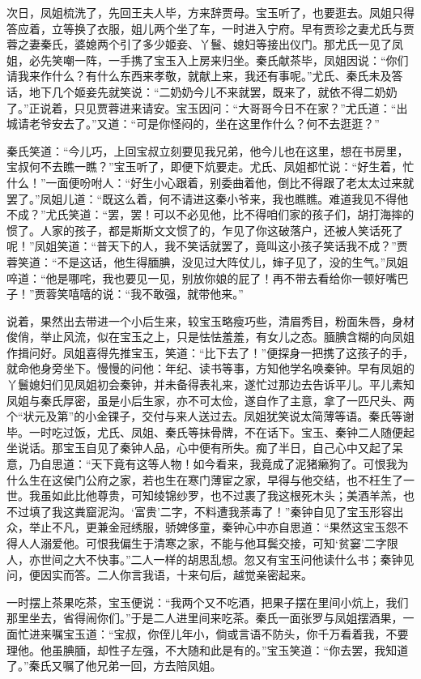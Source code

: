 \documentclass[12pt,oneside]{book}
\begin{document}
次日，凤姐梳洗了，先回王夫人毕，方来辞贾母。宝玉听了，也要逛去。凤姐只得答应着，立等换了衣服，姐儿两个坐了车，一时进入宁府。早有贾珍之妻尤氏与贾蓉之妻秦氏，婆媳两个引了多少姬妾、丫鬟、媳妇等接出仪门。那尤氏一见了凤姐，必先笑嘲一阵，一手携了宝玉入上房来归坐。秦氏献茶毕，凤姐因说：“你们请我来作什么？有什么东西来孝敬，就献上来，我还有事呢。”尤氏、秦氏未及答话，地下几个姬妾先就笑说：“二奶奶今儿不来就罢，既来了，就依不得二奶奶了。”正说着，只见贾蓉进来请安。宝玉因问：“大哥哥今日不在家？”尤氏道：“出城请老爷安去了。”又道：“可是你怪闷的，坐在这里作什么？何不去逛逛？”

秦氏笑道：“今儿巧，上回宝叔立刻要见我兄弟，他今儿也在这里，想在书房里，宝叔何不去瞧一瞧？”宝玉听了，即便下炕要走。尤氏、凤姐都忙说：“好生着，忙什么！”一面便吩咐人：“好生小心跟着，别委曲着他，倒比不得跟了老太太过来就罢了。”凤姐儿道：“既这么着，何不请进这秦小爷来，我也瞧瞧。难道我见不得他不成？”尤氏笑道：“罢，罢！可以不必见他，比不得咱们家的孩子们，胡打海摔的惯了。人家的孩子，都是斯斯文文惯了的，乍见了你这破落户，还被人笑话死了呢！”凤姐笑道：“普天下的人，我不笑话就罢了，竟叫这小孩子笑话我不成？”贾蓉笑道：“不是这话，他生得腼腆，没见过大阵仗儿，婶子见了，没的生气。”凤姐啐道：“他是哪咤，我也要见一见，别放你娘的屁了！再不带去看给你一顿好嘴巴子！”贾蓉笑嘻嘻的说：“我不敢强，就带他来。”

说着，果然出去带进一个小后生来，较宝玉略瘦巧些，清眉秀目，粉面朱唇，身材俊俏，举止风流，似在宝玉之上，只是怯怯羞羞，有女儿之态。腼腆含糊的向凤姐作揖问好。凤姐喜得先推宝玉，笑道：“比下去了！”便探身一把携了这孩子的手，就命他身旁坐下。慢慢的问他：年纪、读书等事，方知他学名唤秦钟。早有凤姐的丫鬟媳妇们见凤姐初会秦钟，并未备得表礼来，遂忙过那边去告诉平儿。平儿素知凤姐与秦氏厚密，虽是小后生家，亦不可太俭，遂自作了主意，拿了一匹尺头、两个“状元及第”的小金锞子，交付与来人送过去。凤姐犹笑说太简薄等语。秦氏等谢毕。一时吃过饭，尤氏、凤姐、秦氏等抹骨牌，不在话下。宝玉、秦钟二人随便起坐说话。那宝玉自见了秦钟人品，心中便有所失。痴了半日，自己心中又起了呆意，乃自思道：“天下竟有这等人物！如今看来，我竟成了泥猪癞狗了。可恨我为什么生在这侯门公府之家，若也生在寒门薄宦之家，早得与他交结，也不枉生了一世。我虽如此比他尊贵，可知绫锦纱罗，也不过裹了我这根死木头；美酒羊羔，也不过填了我这粪窟泥沟。‘富贵’二字，不料遭我荼毒了！”秦钟自见了宝玉形容出众，举止不凡，更兼金冠绣服，骄婢侈童，秦钟心中亦自思道：“果然这宝玉怨不得人人溺爱他。可恨我偏生于清寒之家，不能与他耳鬓交接，可知‘贫窭’二字限人，亦世间之大不快事。”二人一样的胡思乱想。忽又有宝玉问他读什么书；秦钟见问，便因实而答。二人你言我语，十来句后，越觉亲密起来。

一时摆上茶果吃茶，宝玉便说：“我两个又不吃酒，把果子摆在里间小炕上，我们那里坐去，省得闹你们。”于是二人进里间来吃茶。秦氏一面张罗与凤姐摆酒果，一面忙进来嘱宝玉道：“宝叔，你侄儿年小，倘或言语不防头，你千万看着我，不要理他。他虽腆腼，却性子左强，不大随和此是有的。”宝玉笑道：“你去罢，我知道了。”秦氏又嘱了他兄弟一回，方去陪凤姐。
\end{document}
